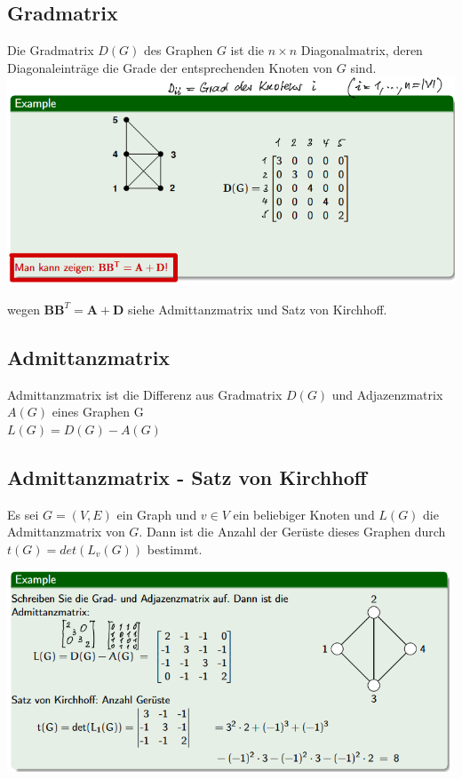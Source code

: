 \documentclass[12pt]{scrartcl}
\begin{document}
\newpage
\subsection{Gradmatrix}
Die Gradmatrix $D(G)$ des Graphen $G$ ist die $n \times n$ Diagonalmatrix, deren 
Diagonaleinträge die Grade der entsprechenden Knoten von $G$ sind.\\

\includegraphics[width=14cm]{img/Gradmatrix.png}

wegen $\mathbf{BB}^T = \mathbf{A + D}$ siehe Admittanzmatrix und Satz von Kirchhoff.

\subsection{Admittanzmatrix}
Admittanzmatrix ist die Differenz aus Gradmatrix $D(G)$ und Adjazenzmatrix $A(G)$ eines Graphen G\\
$L(G) = D(G) - A(G)$


\subsection{Admittanzmatrix - Satz von Kirchhoff}
Es sei $G = (V,E)$ ein Graph und $v \in V$ ein beliebiger Knoten und $L(G)$
die Admittanzmatrix von $G$. Dann ist die Anzahl der Gerüste dieses Graphen durch
$t(G) = det(L_v(G))$ bestimmt.\\

\begin{center}
\includegraphics[height=6cm]{img/kirchhoff.png}
\end{center}
\end{document}
